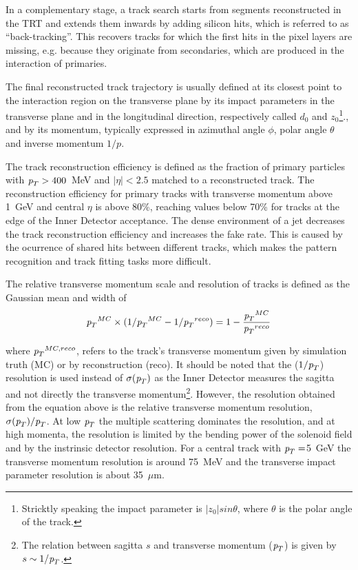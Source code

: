 In a complementary stage, a track search starts from segments reconstructed in the TRT and extends them inwards by adding silicon hits, which is referred to as ``back-tracking''. This recovers tracks for which the first hits in the pixel layers are missing, e.g. because they originate from secondaries, which are produced in the interaction of primaries.

The final reconstructed track trajectory is usually defined at its closest point to the interaction region on the transverse plane by its impact parameters in the transverse plane and in the longitudinal direction, respectively called $d_0$ and $z_0$\footnote{Stricktly speaking the impact parameter is $|z_0|sin\theta$, where $\theta$ is the polar angle of the track.}., and by its momentum, typically expressed in azimuthal angle $\phi$, polar angle $\theta$ and inverse momentum $1/p$. 

 The track reconstruction efficiency is defined as the fraction of primary particles with ${\emph{p}_{T}}> 400$~MeV and $|\eta|<2.5$ matched to a reconstructed track. The reconstruction efficiency for primary tracks with transverse momentum above 1~GeV and central $\eta$ is above 80\%, reaching values below 70\% for tracks at the edge of the Inner Detector acceptance. %
The dense environment of a jet decreases the track reconstruction efficiency and increases the fake rate. This is caused by the ocurrence of shared hits between different tracks, which makes the pattern recognition and track fitting tasks more difficult.

The relative transverse momentum scale and resolution of tracks is defined as the Gaussian mean and width of
%
\begin{equation}
{\emph{p}_{T}}^{MC} \times (1/{\emph{p}_{T}}^{MC}  - 1/{\emph{p}_{T}}^{reco}) = 1 - \frac{{\emph{p}_{T}}^{MC}}{{\emph{p}_{T}}^{reco}}
\end{equation}

where ${\emph{p}_{T}}^{MC,reco}$, refers to the track's transverse momentum given by simulation truth (MC) or by reconstruction (reco). It should be noted that the ($1/{\emph{p}_{T}}$) resolution is used instead of $\sigma({\emph{p}_{T}})$ as the Inner Detector measures the sagitta and not directly the transverse momentum\footnote{The relation between sagitta $s$ and transverse momentum (${\emph{p}_{T}}$) is given by $s \sim  1/{\emph{p}_{T}}$. }.  However, the resolution obtained from the equation above is the relative transverse momentum resolution,  $\sigma({\emph{p}_{T}}) / {\emph{p}_{T}}$. At low ${\emph{p}_{T}}$ the multiple scattering dominates the resolution, and at high momenta, the resolution is limited by the bending power of the solenoid field and by the instrinsic detector resolution.  For a central track with ${\emph{p}_{T}}=$5~GeV %
the transverse momentum resolution is around 75~MeV and the transverse impact parameter resolution is about 35~$\mu$m.



